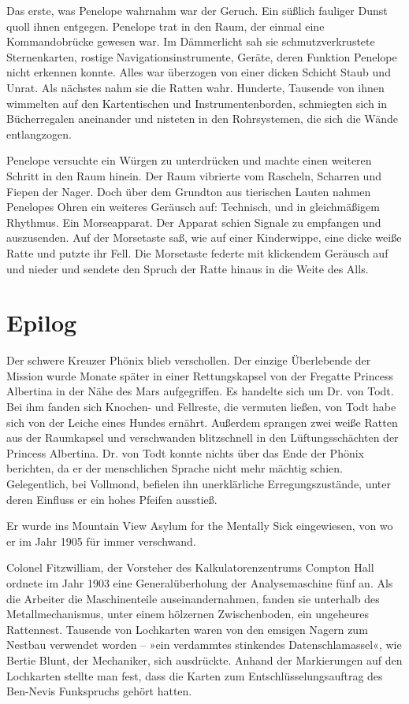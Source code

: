 \bigpar

Das erste, was Penelope wahrnahm war der Geruch. Ein süßlich
fauliger Dunst quoll ihnen entgegen. Penelope trat in den Raum, der
einmal eine Kommandobrücke gewesen war. Im Dämmerlicht sah sie
schmutzverkrustete Sternenkarten, rostige Navigationsinstrumente,
Geräte, deren Funktion Penelope nicht erkennen konnte. Alles war
überzogen von einer dicken Schicht Staub und Unrat. Als nächstes
nahm sie die Ratten wahr. Hunderte, Tausende von ihnen wimmelten
auf den Kartentischen und Instrumentenborden, schmiegten sich in
Bücherregalen aneinander und nisteten in den Rohrsystemen, die sich
die Wände entlangzogen.

\bigpar

Penelope versuchte ein Würgen zu unterdrücken und machte einen
weiteren Schritt in den Raum hinein. Der Raum vibrierte vom
Rascheln, Scharren und Fiepen der Nager. Doch über dem Grundton aus
tierischen Lauten nahmen Penelopes Ohren ein weiteres Geräusch auf:
Technisch, und in gleichmäßigem Rhythmus. Ein Morseapparat. Der
Apparat schien Signale zu empfangen und auszusenden. Auf der
Morsetaste saß, wie auf einer Kinderwippe, eine dicke weiße Ratte
und putzte ihr Fell. Die Morsetaste federte mit klickendem Geräusch
auf und nieder und sendete den Spruch der Ratte hinaus in die Weite
des Alls.

\section{Epilog}

Der schwere Kreuzer Phönix blieb verschollen. Der einzige
Überlebende der Mission wurde Monate später in einer Rettungskapsel
von der Fregatte Princess Albertina in der Nähe des Mars
aufgegriffen. Es handelte sich um Dr. von Todt. Bei ihm fanden sich
Knochen- und Fellreste, die vermuten ließen, von Todt habe sich von
der Leiche eines Hundes ernährt. Außerdem sprangen zwei weiße
Ratten aus der Raumkapsel und verschwanden blitzschnell in den
Lüftungsschächten der Princess Albertina. Dr. von Todt konnte
nichts über das Ende der Phönix berichten, da er der menschlichen
Sprache nicht mehr mächtig schien. Gelegentlich, bei Vollmond,
befielen ihn unerklärliche Erregungszustände, unter deren Einfluss
er ein hohes Pfeifen ausstieß.

Er wurde ins Mountain View Asylum for the Mentally Sick
eingewiesen, von wo er im Jahr 1905 für immer verschwand.

\bigpar

Colonel Fitzwilliam, der Vorsteher des Kalkulatorenzentrums Compton
Hall ordnete im Jahr 1903 eine Generalüberholung der
Analysemaschine fünf an. Als die Arbeiter die Maschinenteile
auseinandernahmen, fanden sie unterhalb des Metallmechanismus,
unter einem hölzernen Zwischenboden, ein ungeheures Rattennest.
Tausende von Lochkarten waren von den emsigen Nagern zum Nestbau
verwendet worden – »ein verdammtes stinkendes Datenschlamassel«,
wie Bertie Blunt, der Mechaniker, sich ausdrückte. Anhand der
Markierungen auf den Lochkarten stellte man fest, dass die Karten
zum Entschlüsselungsauftrag des Ben-Nevis Funkspruchs gehört
hatten.

